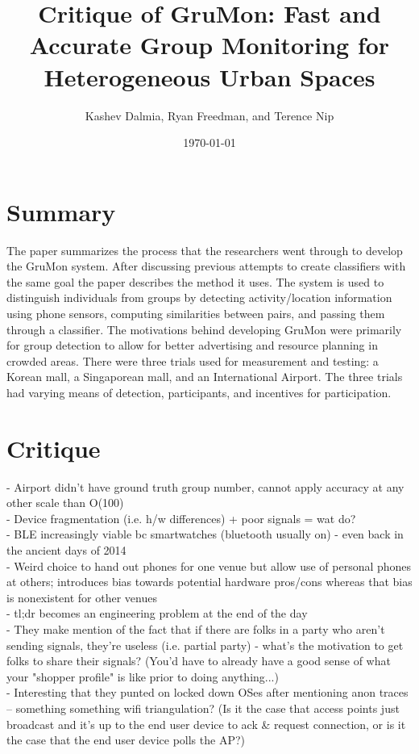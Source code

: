 \documentclass[12pt]{amsart}
\title{Critique of GruMon: Fast and Accurate Group Monitoring for Heterogeneous Urban Spaces}
\author[]{Kashev Dalmia, Ryan Freedman, and Terence Nip}
\affil[]{University of Illinois at Urbana-Champaign}
\date{\today}
\begin{document}
\maketitle

\section{\bf Summary}
The paper summarizes the process that the researchers went through to develop the GruMon system. After discussing previous attempts to create classifiers with the same goal the paper describes the method it uses. The system is used to distinguish individuals from groups by detecting activity/location information using phone sensors, computing similarities between pairs, and passing them through a classifier. The motivations behind developing GruMon were primarily for group detection to allow for better advertising and resource planning in crowded areas. There were three trials used for measurement and testing: a Korean mall, a Singaporean mall, and an International Airport. The three trials had varying means of detection, participants, and incentives for participation.

\section{\bf Critique}
\begin{center}
- Airport didn't have ground truth group number, cannot apply accuracy at any other scale than O(100) \\
- Device fragmentation (i.e. h/w differences) + poor signals = wat do? \\
- BLE increasingly viable bc smartwatches (bluetooth usually on) - even back in the ancient days of 2014 \\
- Weird choice to hand out phones for one venue but allow use of personal phones at others; introduces bias towards potential hardware pros/cons whereas that bias is nonexistent for other venues \\
- tl;dr becomes an engineering problem at the end of the day \\
- They make mention of the fact that if there are folks in a party who aren't sending signals, they're useless (i.e. partial party) - what's the motivation to get folks to share their signals? (You'd have to already have a good sense of what your "shopper profile" is like prior to doing anything...)\\
- Interesting that they punted on locked down OSes after mentioning anon traces -- something something wifi triangulation? (Is it the case that access points just broadcast and it's up to the end user device to ack \& request connection, or is it the case that the end user device polls the AP?) \\
\end{center}
\end{document}
